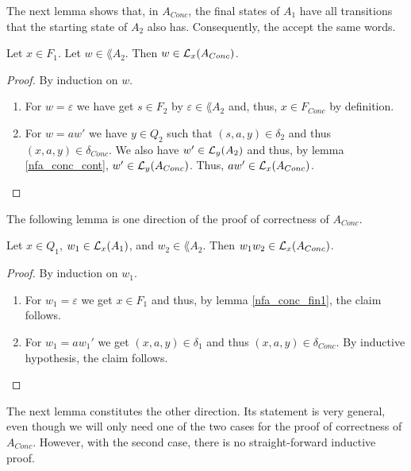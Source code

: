 
The next lemma shows that, in $A_{Conc}$, the final states of $A_1$ have all transitions that the starting state of $A_2$ also has.
Consequently, the accept the same words.

\begin{lemma}
    \label{nfa_conc_fin1}
    Let $x \in F_1$. Let $w \in \lang{A_2}$. Then $w \in \mathcal{L}_{x}(A_{Conc})$.
\end{lemma}
\begin{proof}
    By induction on $w$. 
    \begin{enumerate}
        \item For $w = \varepsilon$ we have get $s \in F_2$ by $\varepsilon \in \lang{A_2}$ and, thus, $x \in F_{Conc}$ by definition.
        \item For $w = aw'$ we have $y \in Q_2$ such that $(s,a,y) \in \delta_2$ and thus $(x,a,y) \in \delta_{Conc}$.
            We also have $w' \in \mathcal{L}_{y}(A_2)$ and thus, by lemma \ref{nfa_conc_cont}, $w' \in \mathcal{L}_{y}(A_{Conc})$.
            Thus, $aw' \in \mathcal{L}_{x}(A_{Conc})$.
    \end{enumerate}
\end{proof}


The following lemma is one direction of the proof of correctness of $A_{Conc}$.

\begin{lemma}
    \label{nfa_conc_complete}
    Let $x \in Q_1$, $w_1 \in \mathcal{L}_{x}(A_1)$, and $w_2 \in \lang{A_2}$. Then $w_1 w_2 \in \mathcal{L}_{x}(A_{Conc})$.
\end{lemma}
\begin{proof}
    By induction on $w_1$.
    \begin{enumerate}
        \item For $w_1 = \varepsilon$ we get $x \in F_1$ and thus, by lemma \ref{nfa_conc_fin1}, the claim follows.
        \item For $w_1 = aw_1'$ we get $(x,a,y) \in \delta_1$ and thus $(x,a,y) \in \delta_{Conc}$. By inductive hypothesis, the claim follows.
    \end{enumerate}
\end{proof}


The next lemma constitutes the other direction. 
Its statement is very general, even though we will only need one of the two cases for the proof of correctness of $A_{Conc}$.
However, with the second case, there is no straight-forward inductive proof.

